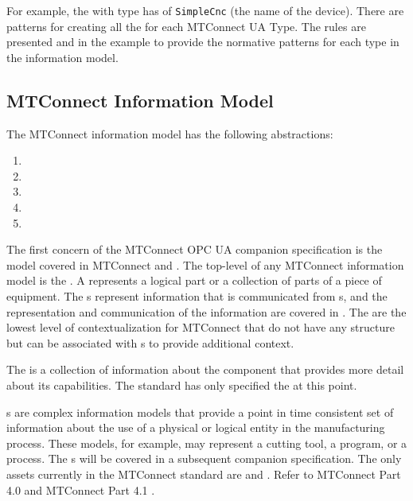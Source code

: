 For example, the with type  has  of \texttt{SimpleCnc} (the name of the device). There are patterns for creating all the  for each MTConnect UA Type. The rules are presented and in the example to provide the normative patterns for each type in the information model.

\FloatBarrier

\subsection{MTConnect Information Model}

The MTConnect information model has the following abstractions:

\begin{enumerate}
\item {}
\item {}
\item {}
\item {}
\item {}
\end{enumerate}

The first concern of the MTConnect OPC UA companion specification is the  model covered in MTConnect \cite{MTCPart2} and \cite{MTCPart3}. The top-level  of any MTConnect information model is the . A  represents a logical part or a collection of parts of a piece of equipment. The s represent information that is communicated from s, and the representation and communication of the information are covered in \cite{MTCPart3}. The  are the lowest level of contextualization for MTConnect  that do not have any structure but can be associated with s to provide additional context. 

The  is a collection of information about the component that provides more detail about its capabilities. The standard has only specified the  at this point.

s are complex information models that provide a point in time consistent set of information about the use of a physical or logical entity in the manufacturing process. These models, for example, may represent a cutting tool, a program, or a process. The s will be covered in a subsequent companion specification. The only assets currently in the MTConnect standard are  and . Refer to MTConnect Part 4.0 \cite{MTCPart40} and MTConnect Part 4.1 \cite{MTCPart41}.

